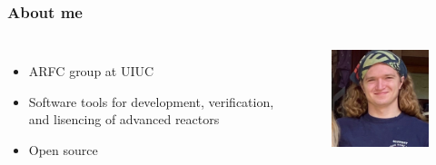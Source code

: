 \begin{frame}
    \frametitle{About me}
    \begin{columns}
        \column[t]{5cm}
        \begin{itemize}
            \item \Gls{ARFC} group at UIUC
            \item Software tools for development, verification, and lisencing of advanced reactors
            \item Open source
        \end{itemize}
        
        \column[t]{5cm}
        \begin{figure}[htpb]
            \centering
            \includegraphics[width=5cm]{images/yardaso.jpeg}
        \end{figure}

    \end{columns}
\end{frame}

